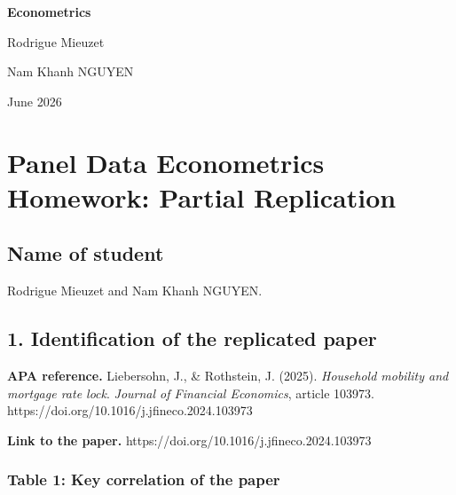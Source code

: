 \documentclass[a4paper,11pt]{article}
\renewcommand{\_}{\textunderscore\allowbreak}
\begin{document}
\begin{center}
    {\LARGE\bfseries Econometrics}\par
    \vspace{0.6cm}
    {\large Rodrigue Mieuzet}\par
    {\large Nam Khanh NGUYEN}\par
    \vspace{0.35cm}
    {June 2026}\par
\end{center}
\vspace{0.5cm}

\hypertarget{panel-data-econometrics-homework-partial-replication}{%
\section{Panel Data Econometrics Homework: Partial
Replication}\label{panel-data-econometrics-homework-partial-replication}}

\hypertarget{name-of-student}{%
\subsection{Name of student}\label{name-of-student}}

Rodrigue Mieuzet and Nam Khanh NGUYEN.

\hypertarget{identification-of-the-replicated-paper}{%
\subsection{1. Identification of the replicated
paper}\label{identification-of-the-replicated-paper}}

\textbf{APA reference.} Liebersohn, J., \& Rothstein, J. (2025).
\emph{Household mobility and mortgage rate lock}. \emph{Journal of
Financial Economics}, article 103973.
https://doi.org/10.1016/j.jfineco.2024.103973

\textbf{Link to the paper.}
https://doi.org/10.1016/j.jfineco.2024.103973

\hypertarget{table-1-key-correlation-of-the-paper}{%
\subsubsection{Table 1: Key correlation of the
paper}\label{table-1-key-correlation-of-the-paper}}
\end{document}
